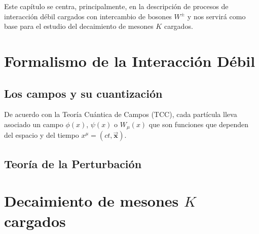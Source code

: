 Este capítulo se centra, principalmente, en la descripción de procesos de interacción débil cargados con intercambio de bosones $W^{\pm}$ y nos servirá como base para el estudio del decaimiento de mesones $K$ cargados.

\section{Formalismo de la Interacción Débil}\label{cap:formalism}
\subsection{Los campos y su cuantización}\label{cap:quantization}
De acuerdo con la Teoría Cuántica de Campos (TCC), cada partícula lleva asociado un campo $\phi(x)$, $\psi(x)$ o $W_{\mu}(x)$ que son funciones que dependen del espacio y del tiempo $x^{\mu}=(ct,\boldsymbol{\vec{x}})$. 
\subsection{Teoría de la Perturbación}\label{cap:perturbation_theory}

\section{Decaimiento de mesones $K$ cargados}
\label{charged_kaon_decay}
\vspace{5mm}